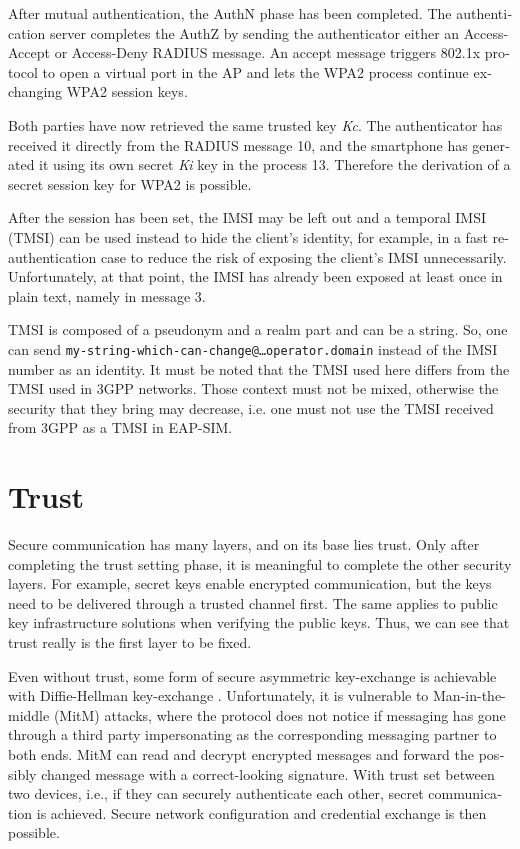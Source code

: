 \documentclass[12pt,a4paper,english]{tutthesis}
\begin{document}
\begin{otherlanguage}{english}
After mutual authentication, the AuthN phase has been completed. The
authentication server completes the AuthZ by sending the authenticator either
an Access-Accept or Access-Deny RADIUS message. 
An accept message triggers 802.1x protocol to open a virtual port in the AP
and lets the WPA2 process continue exchanging WPA2 session keys. 

Both parties have now retrieved the same trusted key \emph{Kc}. The
authenticator has received it directly from the RADIUS message 10, and the
smartphone has generated it using its own secret \emph{Ki} key in
the process 13.
Therefore the derivation of a secret session key for WPA2 is possible.

After the session has been set, the IMSI may be left out and a temporal IMSI
(TMSI) can be used instead to hide the client's identity, for example, 
in a  fast re-authentication case to reduce the risk of exposing the client's
IMSI unnecessarily. Unfortunately, at that point, the IMSI has already
been exposed at least once in plain text, namely in message 3.

TMSI is composed of a pseudonym and a realm part and can be a
string. So, one can send 
\texttt{my-string-which-can-change@…operator.domain} instead of 
the IMSI number as an identity. 
It must be noted that the  TMSI used here differs from the TMSI used in 3GPP
networks. Those context must not be mixed, otherwise the security that
they bring may decrease, i.e. one must not use the TMSI received from
3GPP as a TMSI in EAP-SIM.
\section{Trust}
\label{sec-2-7}

Secure communication has many layers, and on its base lies trust. 
Only after completing the trust setting phase, it is meaningful to complete
the other security layers. For example, secret keys enable encrypted
communication, but the keys need to be delivered through a trusted
channel first. The same applies to public key infrastructure solutions when
verifying the public keys. Thus, we can see that trust
really is the first layer to be fixed.



Even without trust, some form of secure asymmetric key-exchange is achievable
with Diffie-Hellman key-exchange \cite{diffie1976new}. Unfortunately, it is vulnerable
to Man-in-the-middle (MitM) attacks, where the protocol does not
notice if messaging has gone through a third party impersonating as
the corresponding messaging partner to both ends.
MitM can read and decrypt encrypted messages and forward the possibly changed message with
a correct-looking signature.
With trust set between two devices, i.e.,  if they can securely
authenticate each other, secret communication is achieved. 
Secure network configuration and credential exchange is then possible.



\end{otherlanguage}
\end{document}
